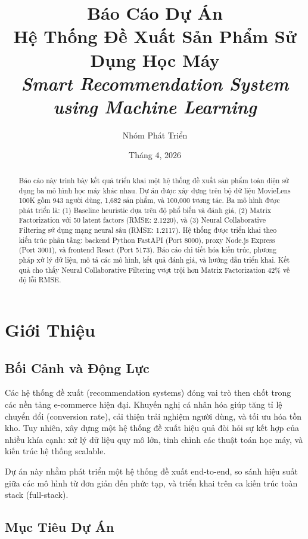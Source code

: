 \documentclass[12pt,a4paper]{article}
\title{\Large\textbf{Báo Cáo Dự Án}\\[0.3cm] \Large\textbf{Hệ Thống Đề Xuất Sản Phẩm Sử Dụng Học Máy}\\[0.1cm] \small \textit{Smart Recommendation System using Machine Learning}}
\author{Nhóm Phát Triển}
\date{Tháng 4, 2026}
\begin{document}
\maketitle

\begin{abstract}
Báo cáo này trình bày kết quả triển khai một hệ thống đề xuất sản phẩm toàn diện sử dụng ba mô hình học máy khác nhau. Dự án được xây dựng trên bộ dữ liệu MovieLens 100K gồm 943 người dùng, 1,682 sản phẩm, và 100,000 tương tác. Ba mô hình được phát triển là: (1) Baseline heuristic dựa trên độ phổ biến và đánh giá, (2) Matrix Factorization với 50 latent factors (RMSE: 2.1220), và (3) Neural Collaborative Filtering sử dụng mạng neural sâu (RMSE: 1.2117). Hệ thống được triển khai theo kiến trúc phân tầng: backend Python FastAPI (Port 8000), proxy Node.js Express (Port 3001), và frontend React (Port 5173). Báo cáo chi tiết hóa kiến trúc, phương pháp xử lý dữ liệu, mô tả các mô hình, kết quả đánh giá, và hướng dẫn triển khai. Kết quả cho thấy Neural Collaborative Filtering vượt trội hơn Matrix Factorization 42\% về độ lỗi RMSE.
\end{abstract}

\newpage
\tableofcontents
\newpage

\section{Giới Thiệu}

\subsection{Bối Cảnh và Động Lực}

Các hệ thống đề xuất (recommendation systems) đóng vai trò then chốt trong các nền tảng e-commerce hiện đại. Khuyến nghị cá nhân hóa giúp tăng tỉ lệ chuyển đổi (conversion rate), cải thiện trải nghiệm người dùng, và tối ưu hóa tồn kho. Tuy nhiên, xây dựng một hệ thống đề xuất hiệu quả đòi hỏi sự kết hợp của nhiều khía cạnh: xử lý dữ liệu quy mô lớn, tinh chỉnh các thuật toán học máy, và kiến trúc hệ thống scalable.

Dự án này nhằm phát triển một hệ thống đề xuất end-to-end, so sánh hiệu suất giữa các mô hình từ đơn giản đến phức tạp, và triển khai trên ca kiến trúc toàn stack (full-stack).

\subsection{Mục Tiêu Dự Án}
\end{document}
